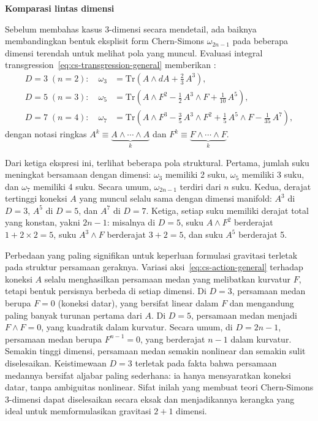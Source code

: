 \vspace{0.5em}
\noindent \textbf{Komparasi lintas dimensi}

Sebelum membahas kasus 3-dimensi secara mendetail, ada baiknya membandingkan bentuk eksplisit form Chern-Simons $\omega_{2n-1}$ pada beberapa dimensi terendah untuk melihat pola yang muncul. Evaluasi integral transgression~\eqref{eq:cs-transgression-general} memberikan \cite{zanelli2005lecture}:
\begin{align}
    D = 3\; (n=2): \quad \omega_3 &= \mathrm{Tr}\!\left(A \wedge dA + \frac{2}{3}\, A^3\right), \label{eq:cs-compare-3}\\[6pt]
    D = 5\; (n=3): \quad \omega_5 &= \mathrm{Tr}\!\left(A \wedge F^2 - \frac{1}{2}\, A^3 \wedge F + \frac{1}{10}\, A^5\right), \label{eq:cs-compare-5}\\[6pt]
    D = 7\; (n=4): \quad \omega_7 &= \mathrm{Tr}\!\left(A \wedge F^3 - \frac{3}{5}\, A^3 \wedge F^2 + \frac{1}{5}\, A^5 \wedge F - \frac{1}{35}\, A^7\right), \label{eq:cs-compare-7}
\end{align}
dengan notasi ringkas $A^k \equiv \underbrace{A \wedge \cdots \wedge A}_{k}$ dan $F^k \equiv \underbrace{F \wedge \cdots \wedge F}_{k}$.

Dari ketiga ekspresi ini, terlihat beberapa pola struktural. Pertama, jumlah suku meningkat bersamaan dengan dimensi: $\omega_3$ memiliki 2 suku, $\omega_5$ memiliki 3 suku, dan $\omega_7$ memiliki 4 suku. Secara umum, $\omega_{2n-1}$ terdiri dari $n$ suku. Kedua, derajat tertinggi koneksi $A$ yang muncul selalu sama dengan dimensi manifold: $A^3$ di $D = 3$, $A^5$ di $D = 5$, dan $A^7$ di $D = 7$. Ketiga, setiap suku memiliki derajat total yang konstan, yakni $2n - 1$: misalnya di $D = 5$, suku $A \wedge F^2$ berderajat $1 + 2 \times 2 = 5$, suku $A^3 \wedge F$ berderajat $3 + 2 = 5$, dan suku $A^5$ berderajat 5.

Perbedaan yang paling signifikan untuk keperluan formulasi gravitasi terletak pada struktur persamaan geraknya. Variasi aksi~\eqref{eq:cs-action-general} terhadap koneksi $A$ selalu menghasilkan persamaan medan yang melibatkan kurvatur $F$, tetapi bentuk persisnya berbeda di setiap dimensi. Di $D = 3$, persamaan medan berupa $F = 0$ (koneksi datar), yang bersifat linear dalam $F$ dan mengandung paling banyak turunan pertama dari $A$. Di $D = 5$, persamaan medan menjadi $F \wedge F = 0$, yang kuadratik dalam kurvatur. Secara umum, di $D = 2n - 1$, persamaan medan berupa $F^{n-1} = 0$, yang berderajat $n - 1$ dalam kurvatur. Semakin tinggi dimensi, persamaan medan semakin nonlinear dan semakin sulit diselesaikan. Keistimewaan $D = 3$ terletak pada fakta bahwa persamaan medannya bersifat aljabar paling sederhana: ia hanya mensyaratkan koneksi datar, tanpa ambiguitas nonlinear. Sifat inilah yang membuat teori Chern-Simons 3-dimensi dapat diselesaikan secara eksak dan menjadikannya kerangka yang ideal untuk memformulasikan gravitasi $2+1$ dimensi.


